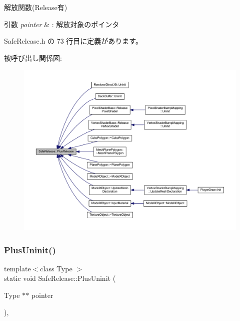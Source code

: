 解放関数(Release有) 


\begin{DoxyParams}{引数}
{\em pointer} & \+: 解放対象のポインタ \\
\hline
\end{DoxyParams}


 Safe\+Release.\+h の 73 行目に定義があります。

被呼び出し関係図\+:\nopagebreak
\begin{figure}[H]
\begin{center}
\leavevmode
\includegraphics[width=350pt]{class_safe_release_a507950335a85da67c1722cce83dca9ae_icgraph}
\end{center}
\end{figure}
\mbox{\label{class_safe_release_a06160f5466a88f021e6f28489de9df1e}} 
\subsubsection{\texorpdfstring{Plus\+Uninit()}{PlusUninit()}}
{\footnotesize\ttfamily template$<$class Type $>$ \\
static void Safe\+Release\+::\+Plus\+Uninit (\begin{DoxyParamCaption}\item[{Type $\ast$$\ast$}]{pointer }\end{DoxyParamCaption})\hspace{0.3cm}{\ttfamily [inline]}, {\ttfamily [static]}}



